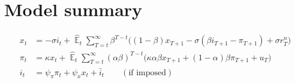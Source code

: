 \documentclass[11pt]{article}
\renewcommand{\[}{\begin{equation}}
\renewcommand{\]}{\end{equation}}
\DeclareMathOperator{\E}{\mathbb{E}}
\newcommand\numberthis{\addtocounter{equation}{1}\tag{\theequation}} %
\begin{document}






\newpage
\appendix
\section{Model summary}

\vspace{-0.5cm}

\begin{align}
x_t &=  -\sigma i_t +\hat{\E}_t \sum_{T=t}^{\infty} \beta^{T-t }\big( (1-\beta)x_{T+1} - \sigma(\beta i_{T+1} - \pi_{T+1}) +\sigma r_T^n \big)  \label{prestons18}  \\
\pi_t &= \kappa x_t +\hat{\E}_t \sum_{T=t}^{\infty} (\alpha\beta)^{T-t }\big( \kappa \alpha \beta x_{T+1} + (1-\alpha)\beta \pi_{T+1} + u_T\big) \label{prestons19}  \\
i_t &= \psi_{\pi}\pi_t + \psi_{x} x_t  + \bar{i}_t \label{TR} \quad \quad (\text{if imposed})
\end{align}
\end{document}
